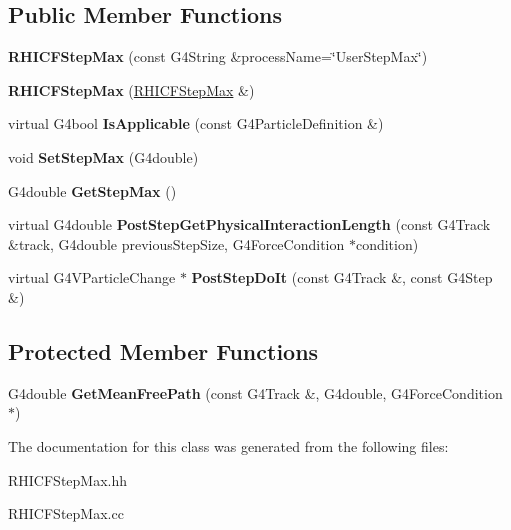 \subsection*{Public Member Functions}
\begin{DoxyCompactItemize}
\item 
\hypertarget{class_r_h_i_c_f_step_max_aae289bfe6b0e528eec5fd7f76cdd17d4}{}{\bfseries R\+H\+I\+C\+F\+Step\+Max} (const G4\+String \&process\+Name=\char`\"{}User\+Step\+Max\char`\"{})\label{class_r_h_i_c_f_step_max_aae289bfe6b0e528eec5fd7f76cdd17d4}

\item 
\hypertarget{class_r_h_i_c_f_step_max_a30514c9ca58f851c078206f3f45ae345}{}{\bfseries R\+H\+I\+C\+F\+Step\+Max} (\hyperlink{class_r_h_i_c_f_step_max}{R\+H\+I\+C\+F\+Step\+Max} \&)\label{class_r_h_i_c_f_step_max_a30514c9ca58f851c078206f3f45ae345}

\item 
\hypertarget{class_r_h_i_c_f_step_max_ac3278c1ddb1cf246f1179e0e5b473f4c}{}virtual G4bool {\bfseries Is\+Applicable} (const G4\+Particle\+Definition \&)\label{class_r_h_i_c_f_step_max_ac3278c1ddb1cf246f1179e0e5b473f4c}

\item 
\hypertarget{class_r_h_i_c_f_step_max_a2aa60672d93c58b7ae2030886ff8d49e}{}void {\bfseries Set\+Step\+Max} (G4double)\label{class_r_h_i_c_f_step_max_a2aa60672d93c58b7ae2030886ff8d49e}

\item 
\hypertarget{class_r_h_i_c_f_step_max_a46240c85112d681e3e53a1c56712439c}{}G4double {\bfseries Get\+Step\+Max} ()\label{class_r_h_i_c_f_step_max_a46240c85112d681e3e53a1c56712439c}

\item 
\hypertarget{class_r_h_i_c_f_step_max_aeae09e23a80e849d445df310933f0579}{}virtual G4double {\bfseries Post\+Step\+Get\+Physical\+Interaction\+Length} (const G4\+Track \&track, G4double previous\+Step\+Size, G4\+Force\+Condition $\ast$condition)\label{class_r_h_i_c_f_step_max_aeae09e23a80e849d445df310933f0579}

\item 
\hypertarget{class_r_h_i_c_f_step_max_ae59e251e8ef437c3752c2fa968d0084d}{}virtual G4\+V\+Particle\+Change $\ast$ {\bfseries Post\+Step\+Do\+It} (const G4\+Track \&, const G4\+Step \&)\label{class_r_h_i_c_f_step_max_ae59e251e8ef437c3752c2fa968d0084d}

\end{DoxyCompactItemize}
\subsection*{Protected Member Functions}
\begin{DoxyCompactItemize}
\item 
\hypertarget{class_r_h_i_c_f_step_max_a82145133afd99cda8d5f1de9e1c53c64}{}G4double {\bfseries Get\+Mean\+Free\+Path} (const G4\+Track \&, G4double, G4\+Force\+Condition $\ast$)\label{class_r_h_i_c_f_step_max_a82145133afd99cda8d5f1de9e1c53c64}

\end{DoxyCompactItemize}


The documentation for this class was generated from the following files\+:\begin{DoxyCompactItemize}
\item 
R\+H\+I\+C\+F\+Step\+Max.\+hh\item 
R\+H\+I\+C\+F\+Step\+Max.\+cc\end{DoxyCompactItemize}
